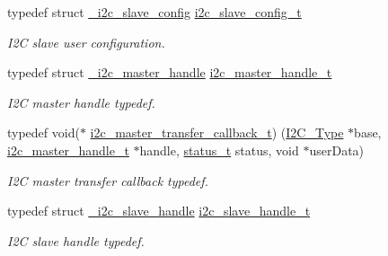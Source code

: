 \begin{DoxyCompactItemize}
\mbox{\label{group__i2c__driver_gaa70dd0ec9815617269569190efd2de5d}} 
typedef struct \mbox{\hyperlink{struct__i2c__slave__config}{\+\_\+i2c\+\_\+slave\+\_\+config}} \mbox{\hyperlink{group__i2c__driver_gaa70dd0ec9815617269569190efd2de5d}{i2c\+\_\+slave\+\_\+config\+\_\+t}}
\begin{DoxyCompactList}\small\item\em I2C slave user configuration. \end{DoxyCompactList}\item 
\mbox{\label{group__i2c__driver_ga2fd51f58b8cfd309be985bce4b817fdc}} 
typedef struct \mbox{\hyperlink{struct__i2c__master__handle}{\+\_\+i2c\+\_\+master\+\_\+handle}} \mbox{\hyperlink{group__i2c__driver_ga2fd51f58b8cfd309be985bce4b817fdc}{i2c\+\_\+master\+\_\+handle\+\_\+t}}
\begin{DoxyCompactList}\small\item\em I2C master handle typedef. \end{DoxyCompactList}\item 
\mbox{\label{group__i2c__driver_gafa39d30cd808d79b774361874f227204}} 
typedef void($\ast$ \mbox{\hyperlink{group__i2c__driver_gafa39d30cd808d79b774361874f227204}{i2c\+\_\+master\+\_\+transfer\+\_\+callback\+\_\+t}}) (\mbox{\hyperlink{struct_i2_c___type}{I2\+C\+\_\+\+Type}} $\ast$base, \mbox{\hyperlink{group__i2c__driver_ga2fd51f58b8cfd309be985bce4b817fdc}{i2c\+\_\+master\+\_\+handle\+\_\+t}} $\ast$handle, \mbox{\hyperlink{group__ksdk__common_gaaabdaf7ee58ca7269bd4bf24efcde092}{status\+\_\+t}} status, void $\ast$user\+Data)
\begin{DoxyCompactList}\small\item\em I2C master transfer callback typedef. \end{DoxyCompactList}\item 
\mbox{\label{group__i2c__driver_ga394e5278816efe62815de9d25be84752}} 
typedef struct \mbox{\hyperlink{struct__i2c__slave__handle}{\+\_\+i2c\+\_\+slave\+\_\+handle}} \mbox{\hyperlink{group__i2c__driver_ga394e5278816efe62815de9d25be84752}{i2c\+\_\+slave\+\_\+handle\+\_\+t}}
\begin{DoxyCompactList}\small\item\em I2C slave handle typedef. \end{DoxyCompactList}\item 

\end{DoxyCompactItemize}
